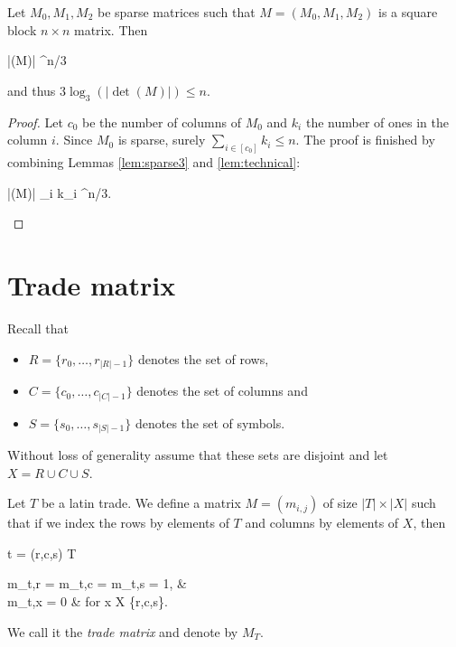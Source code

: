 \begin{lem}
\label{lem:3-block-sparse-det}
Let $M_0,M_1,M_2$ be sparse matrices such that $M = (M_0,M_1,M_2)$ is a  square block $n \times n$ matrix. Then
\begin{cosyeqnarray}
 	|\det(M)| ^{n/3}
\end{cosyeqnarray}%
and thus $3 \log_3(|\det(M)|) \leq n$.
\end{lem}
\begin{proof}
Let $c_0$ be the number of columns of $M_0$ and $k_i$ the number of ones in the column $i$. Since $M_0$ is sparse, surely $\sum_{i \in [c_0]} k_i \leq n$. The proof is finished by combining Lemmas \ref{lem:sparse3} and \ref{lem:technical}:
\begin{cosyeqnarray}
	|\det(M)| \leq \prod_{i \in [c_0]} k_i ^{n/3}.
\end{cosyeqnarray}%
\end{proof}

\section{Trade matrix}
Recall that
\begin{itemize}
	\item $R = \{r_0,\dots,r_{|R|-1}\}$ denotes the set of rows,
	\item $C = \{c_0,\dots,c_{|C|-1}\}$ denotes the set of columns and
	\item $S = \{s_0,\dots,s_{|S|-1}\}$ denotes the set of symbols.
\end{itemize}
Without loss of generality assume that these sets are disjoint and let $X = R \cup C \cup S$.

\begin{defn}
Let $T$ be a latin trade. We define a matrix $M = (m_{i,j})$ of size $|T| \times |X|$ such that if we index the rows by elements of $T$ and columns by elements of $X$, then
\begin{cosyeqnarray}
	t = (r,c,s) \in T \Rightarrow
	\begin{cases}
		m_{t,r} = m_{t,c} = m_{t,s} = 1, & \\
		m_{t,x} = 0 & \textrm{ for } x \in X \setminus \{r,c,s\}.
	\end{cases}
\end{cosyeqnarray}%
\end{defn}
We call it the \emph{trade matrix} and denote by $M_T$.

